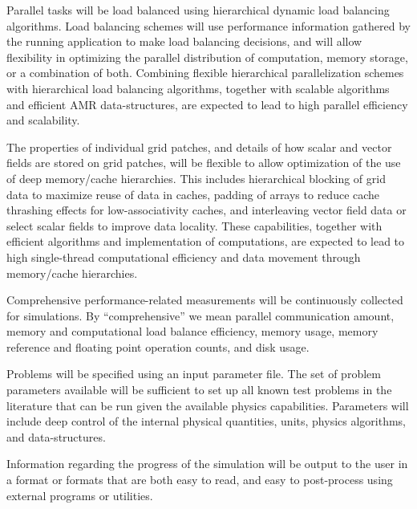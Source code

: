 \documentclass{book}
\begin{document}

   Parallel tasks will be load balanced using hierarchical dynamic
   load balancing algorithms.  Load balancing schemes will use
   performance information gathered by the running application to make
   load balancing decisions, and will allow flexibility in optimizing
   the parallel distribution of computation, memory storage, or a
   combination of both.  Combining flexible hierarchical
   parallelization schemes with hierarchical load balancing
   algorithms, together with scalable algorithms and efficient AMR
   data-structures, are expected to lead to high parallel efficiency
   and scalability.


   The properties of individual grid patches, and details of how
   scalar and vector fields are stored on grid patches, will be
   flexible to allow optimization of the use of deep memory/cache
   hierarchies.  This includes hierarchical blocking of grid data to 
   maximize reuse of data in caches, padding of arrays to reduce
   cache thrashing effects for low-associativity caches, and interleaving
   vector field data or select scalar fields to improve data locality.
   These capabilities, together with efficient algorithms and 
   implementation of computations, are expected to lead to high
   single-thread computational efficiency and data movement through
   memory/cache hierarchies.


   Comprehensive performance-related measurements will be continuously
   collected for simulations.  By ``comprehensive'' we mean parallel
   communication amount, memory and computational load balance
   efficiency, memory usage, memory reference and floating point
   operation counts, and disk usage.


   Problems will be specified using an input parameter file.  The set
   of problem parameters available will be sufficient to set up all
   known test problems in the literature that can be run given the
   available physics capabilities.  Parameters will include deep
   control of the internal physical quantities, units, physics
   algorithms, and data-structures.

   Information regarding the progress of the simulation will be 
   output to the user in a format or formats that are both easy
   to read, and easy to post-process using external programs or
   utilities.
   
\end{document}
